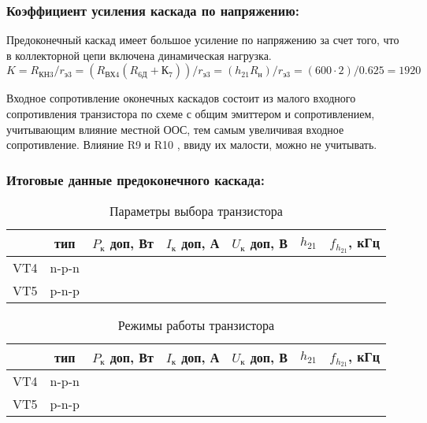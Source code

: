 \subsubsection{Коэффициент усиления каскада по напряжению:}

Предоконечный каскад имеет большое усиление по напряжению за счет того, что в коллекторной цепи включена динамическая нагрузка.
\begin{equation}
\label{eq:equation3_17}
 K = R_{\text{КН3}} / r_{\text{э3}} = (R_{\text{ВХ4}} ( R_{\text{6Д}} + К_7)) / r_{\text{э3}} = (h_{21} R_{н}) / r_{\text{э3}} = (600 \cdot 2) / 0.625 = 1920
\end{equation}

Входное сопротивление оконечных каскадов состоит из малого входного сопротивления транзистора по схеме с общим эмиттером и сопротивлением, учитывающим влияние местной ООС, тем самым увеличивая входное сопротивление.  Влияние R9 и R10 , ввиду их малости, можно не учитывать. \par

\subsubsection{Итоговые данные предоконечного каскада:}

\begin{table}[htbp]
\caption{Параметры выбора транзистора}
\begin{center}\begin{tabular}{|c|c|c|c|c|c|c|}
\hline 
  & тип & $P_{\text{к}}$ доп, Вт & $I_{\text{к}}$ доп, А & $U_{\text{к}}$ доп, В & $h_{21}$ &  $f_{h_{21}}$, кГц \\ 
\hline 
VT4 & n-p-n &   &  &  &  & \\ 
\hline 
VT5 & p-n-p &   &  &  &  &  \\ 
\hline 
\end{tabular} 
\end{center}
\end{table}

\clearpage

\begin{table}[htbp]
\caption{Режимы работы транзистора}
\begin{center}\begin{tabular}{|c|c|c|c|c|c|c|}
\hline 
  & тип & $P_{\text{к}}$ доп, Вт & $I_{\text{к}}$ доп, А & $U_{\text{к}}$ доп, В & $h_{21}$ &  $f_{h_{21}}$, кГц \\ 
\hline 
VT4 & n-p-n &   &  &  &  & \\ 
\hline 
VT5 & p-n-p &   &  &  &  &  \\ 
\hline 
\end{tabular} 
\end{center}
\end{table}

\clearpage